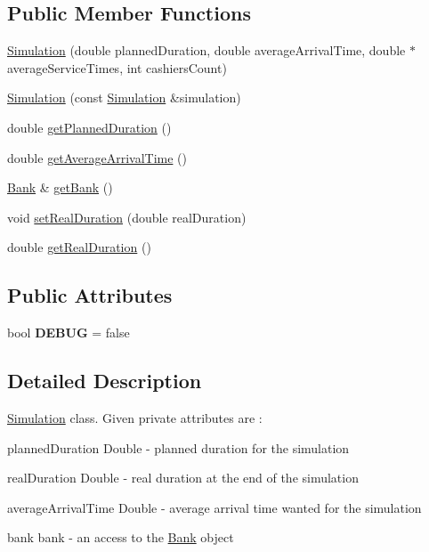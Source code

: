 \subsection*{Public Member Functions}
\begin{DoxyCompactItemize}
\item 
\hyperlink{classSimulation_a4709539e1e5ef724442ba1484d4a9ab8}{Simulation} (double planned\+Duration, double average\+Arrival\+Time, double $\ast$average\+Service\+Times, int cashiers\+Count)
\item 
\hyperlink{classSimulation_ad82aba6067f881a5c364ea6b6b317325}{Simulation} (const \hyperlink{classSimulation}{Simulation} \&simulation)
\item 
double \hyperlink{classSimulation_a242c58ccefca3705bdc47ee7827c24fe}{get\+Planned\+Duration} ()
\item 
double \hyperlink{classSimulation_a1e4f97c6011a0cbce91c5034c917ab46}{get\+Average\+Arrival\+Time} ()
\item 
\hyperlink{classBank}{Bank} \& \hyperlink{classSimulation_a280ef124f9f6395a446b36a9dd45e4bc}{get\+Bank} ()
\item 
void \hyperlink{classSimulation_af7d8147539e8ea62f83c44fa0431e27d}{set\+Real\+Duration} (double real\+Duration)
\item 
double \hyperlink{classSimulation_a18218154310af27c087def0936690346}{get\+Real\+Duration} ()
\end{DoxyCompactItemize}
\subsection*{Public Attributes}
\begin{DoxyCompactItemize}
\item 
\mbox{\label{classSimulation_ae125e30e669048458632583d63c6683e}} 
bool {\bfseries D\+E\+B\+UG} = false
\end{DoxyCompactItemize}


\subsection{Detailed Description}
\hyperlink{classSimulation}{Simulation} class. Given private attributes are \+:
\begin{DoxyItemize}
\item planned\+Duration Double -\/ planned duration for the simulation
\item real\+Duration Double -\/ real duration at the end of the simulation
\item average\+Arrival\+Time Double -\/ average arrival time wanted for the simulation
\item bank bank -\/ an access to the \hyperlink{classBank}{Bank} object 
\end{DoxyItemize}

